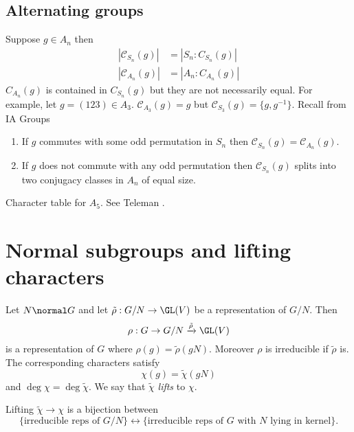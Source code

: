 \documentclass[a4paper]{article}
\theoremstyle{definition}
\begin{document}
\subsection{Alternating groups}

Suppose \(g \in A_n\) then
\begin{align*}
  |\mathcal C_{S_n}(g)| &= |S_n : C_{S_n}(g)| \\
  |\mathcal C_{A_n}(g)| &= |A_n : C_{A_n}(g)|
\end{align*}
\(C_{A_n}(g)\) is contained in \(C_{S_n}(g)\) but they are not necessarily equal. For example, let \(g = (123) \in A_3\). \(\mathcal C_{A_3} (g) = g\) but \(\mathcal C_{S_3}(g) = \{g, g^{-1}\}\). Recall from IA Groups

\begin{lemma}\leavevmode
  \begin{enumerate}
  \item If \(g\) commutes with some odd permutation in \(S_n\) then \(\mathcal C_{S_n}(g) = \mathcal C_{A_n}(g)\).
  \item If \(g\) does not commute with any odd permutation then \(\mathcal C_{S_n}(g)\) splits into two conjugacy classes in \(A_n\) of equal size.
  \end{enumerate}
\end{lemma}

\begin{ex}
  Character table for \(A_5\). See Teleman .
\end{ex}

\section{Normal subgroups and lifting characters}

\begin{lemma}[lifting]
  \label{lemma:lifting}
  Let \(N \normal G\) and let \(\tilde \rho: G/N \to \GL(V)\) be a representation of \(G/N\). Then
  \[
    \rho: G \to G/N \xrightarrow{\tilde \rho} \GL(V)
  \]
  is a representation of \(G\) where \(\rho(g) = \tilde \rho (gN)\). Moreover \(\rho\) is irreducible if \(\tilde \rho\) is. The corresponding characters satisfy
  \[
    \chi(g) = \tilde \chi(gN)
  \]
  and \(\deg \chi = \deg \tilde \chi\). We say that \(\tilde \chi\) \emph{lifts} to \(\chi\).

  Lifting \(\tilde \chi \to \chi\) is a bijection between
  \[
    \{\text{irreducible reps of \(G/N\)}\} \leftrightarrow \{\text{irreducible reps of \(G\) with \(N\) lying in kernel}\}.
  \]
\end{lemma}
\end{document}
